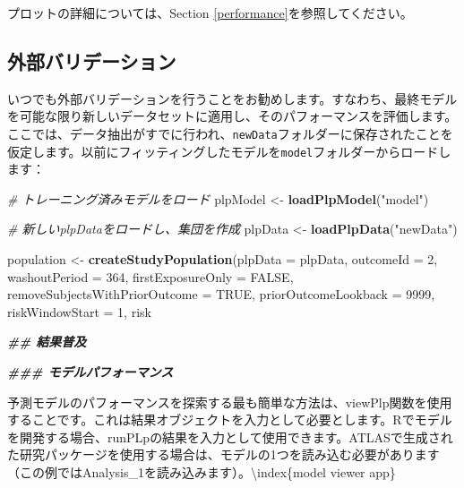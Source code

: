 \documentclass[
  11pt]{book}
\newenvironment{Shaded}{\begin{snugshade}}{\end{snugshade}}
\newcommand{\AttributeTok}[1]{\textcolor[rgb]{0.13,0.29,0.53}{#1}}
\newcommand{\CommentTok}[1]{\textcolor[rgb]{0.56,0.35,0.01}{\textit{#1}}}
\newcommand{\ConstantTok}[1]{\textcolor[rgb]{0.56,0.35,0.01}{#1}}
\newcommand{\DecValTok}[1]{\textcolor[rgb]{0.00,0.00,0.81}{#1}}
\newcommand{\DocumentationTok}[1]{\textcolor[rgb]{0.56,0.35,0.01}{\textbf{\textit{#1}}}}
\newcommand{\FunctionTok}[1]{\textcolor[rgb]{0.13,0.29,0.53}{\textbf{#1}}}
\newcommand{\NormalTok}[1]{#1}
\newcommand{\OtherTok}[1]{\textcolor[rgb]{0.56,0.35,0.01}{#1}}
\newcommand{\StringTok}[1]{\textcolor[rgb]{0.31,0.60,0.02}{#1}}
\theoremstyle{definition}
\theoremstyle{definition}
\theoremstyle{definition}
\theoremstyle{definition}
\theoremstyle{remark}
\begin{document}
プロットの詳細については、Section \ref{performance}を参照してください。

\subsection{外部バリデーション}\label{ux5916ux90e8ux30d0ux30eaux30c7ux30fcux30b7ux30e7ux30f3}

いつでも外部バリデーションを行うことをお勧めします。すなわち、最終モデルを可能な限り新しいデータセットに適用し、そのパフォーマンスを評価します。ここでは、データ抽出がすでに行われ、\texttt{newData}フォルダーに保存されたことを仮定します。以前にフィッティングしたモデルを\texttt{model}フォルダーからロードします：

\begin{Shaded}
\begin{Highlighting}[]
\CommentTok{\# トレーニング済みモデルをロード}
\NormalTok{plpModel }\OtherTok{\textless{}{-}} \FunctionTok{loadPlpModel}\NormalTok{(}\StringTok{"model"}\NormalTok{)}

\CommentTok{\# 新しいplpDataをロードし、集団を作成}
\NormalTok{plpData }\OtherTok{\textless{}{-}} \FunctionTok{loadPlpData}\NormalTok{(}\StringTok{"newData"}\NormalTok{)}

\NormalTok{population }\OtherTok{\textless{}{-}} \FunctionTok{createStudyPopulation}\NormalTok{(}\AttributeTok{plpData =}\NormalTok{ plpData,}
                                    \AttributeTok{outcomeId =} \DecValTok{2}\NormalTok{,}
                                    \AttributeTok{washoutPeriod =} \DecValTok{364}\NormalTok{,}
                                    \AttributeTok{firstExposureOnly =} \ConstantTok{FALSE}\NormalTok{,}
                                    \AttributeTok{removeSubjectsWithPriorOutcome =} \ConstantTok{TRUE}\NormalTok{,}
                                    \AttributeTok{priorOutcomeLookback =} \DecValTok{9999}\NormalTok{,}
                                    \AttributeTok{riskWindowStart =} \DecValTok{1}\NormalTok{,}
\NormalTok{                                    risk}
                                    
\DocumentationTok{\#\# 結果普及}

\DocumentationTok{\#\#\# モデルパフォーマンス}

\NormalTok{予測モデルのパフォーマンスを探索する最も簡単な方法は、}\StringTok{\textasciigrave{}}\AttributeTok{viewPlp}\StringTok{\textasciigrave{}}\NormalTok{関数を使用することです。これは結果オブジェクトを入力として必要とします。Rでモデルを開発する場合、}\StringTok{\textasciigrave{}}\AttributeTok{runPLp}\StringTok{\textasciigrave{}}\NormalTok{の結果を入力として使用できます。ATLASで生成された研究パッケージを使用する場合は、モデルの1つを読み込む必要があります（この例ではAnalysis\_1を読み込みます）。\textbackslash{}index\{model viewer app\}}
\end{Highlighting}
\end{Shaded}
\end{document}
